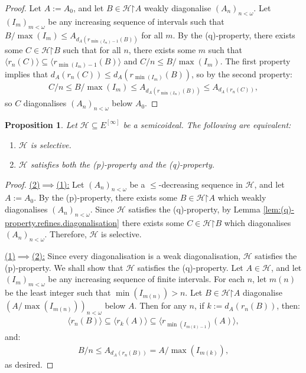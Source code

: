 \documentclass[10pt,a4paper]{amsart}
\theoremstyle{plain}
\numberwithin{equation}{section}
\newtheorem{proposition}[theorem]{Proposition}
\theoremstyle{definition}
\renewcommand{\c}[1]{\langle #1 \rangle}
\newcommand{\cal}{\mathcal}
\newcommand{\restrictedto}{\mathord{\upharpoonright}}
\renewcommand{\H}{\cal{H}}
\begin{document}
\begin{proof}
    Let $A := A_0$, and let $B \in \H\restrictedto A$ weakly diagonalise $(A_n)_{n<\omega}$. Let $(I_m)_{m<\omega}$ be any increasing sequence of intervals such that $B/\max(I_m) \leq A_{d_A(r_{\min(I_m)-1}(B))}$ for all $m$. By the (q)-property, there exists some $C \in \H\restrictedto B$ such that for all $n$, there exists some $m$ such that $\c{r_n(C)} \subseteq \c{r_{\min(I_m)-1}(B)}$ and $C/n \leq B/\max(I_m)$. The first property implies that $d_A(r_n(C)) \leq d_A(r_{\min(I_m)}(B))$, so by the second property:
    \begin{align*}
        C/n \leq B/\max(I_m) \leq A_{d_A(r_{\min(I_m)}(B))} \leq A_{d_A(r_n(C))},
    \end{align*}
    so $C$ diagonalises $(A_n)_{n<\omega}$ below $A_0$.
\end{proof}

\begin{proposition}
\label{prop:selective.iff.(p,q)}
    Let $\H \subseteq E^{[\infty]}$ be a semicoideal. The following are equivalent:
    \begin{enumerate}
        \item $\H$ is selective.

        \item $\H$ satisfies both the (p)-property and the (q)-property.
    \end{enumerate}
\end{proposition}

\begin{proof} 
    \underline{(2)$\implies$(1):} Let $(A_n)_{n<\omega}$ be a $\leq$-decreasing sequence in $\H$, and let $A := A_0$. By the (p)-property, there exists some $B \in \H\restrictedto A$ which weakly diagonalises $(A_n)_{n<\omega}$. Since $\H$ satisfies the (q)-property, by Lemma \ref{lem:(q)-property.refines.diagonalisation} there exists some $C \in \H\restrictedto B$ which diagonalises $(A_n)_{n<\omega}$. Therefore, $\H$ is selective.

    \underline{(1)$\implies$(2):} Since every diagonalisation is a weak diagonalisation, $\H$ satisfies the (p)-property. We shall show that $\H$ satisfies the (q)-property. Let $A \in \H$, and let $(I_m)_{m<\omega}$ be any increasing sequence of finite intervals. For each $n$, let $m(n)$ be the least integer such that $\min(I_{m(n)}) > n$. Let $B \in \H\restrictedto A$ diagonalise $(A/\max(I_{m(n)}))_{n<\omega}$ below $A$. Then for any $n$, if $k := d_A(r_n(B))$, then:
    \begin{align*}
        \c{r_n(B)} \subseteq \c{r_k(A)} \subseteq \c{r_{\min(I_{m(k)-1})}(A)},
    \end{align*}
    and:
    \begin{align*}
        B/n \leq A_{d_A(r_n(B))} = A/\max(I_{m(k)}),
    \end{align*}
    as desired.
\end{proof}
\end{document}
